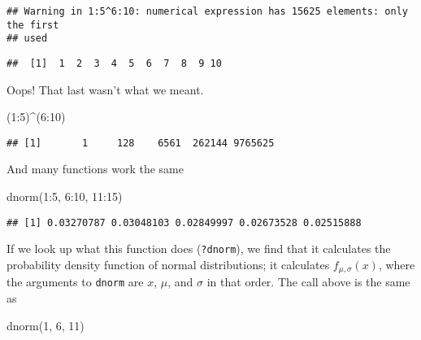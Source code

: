 \documentclass[
]{article}
\newenvironment{Shaded}{\begin{snugshade}}{\end{snugshade}}
\newcommand{\DecValTok}[1]{\textcolor[rgb]{0.00,0.00,0.81}{#1}}
\newcommand{\FunctionTok}[1]{\textcolor[rgb]{0.00,0.00,0.00}{#1}}
\newcommand{\NormalTok}[1]{#1}
\newcommand{\SpecialCharTok}[1]{\textcolor[rgb]{0.00,0.00,0.00}{#1}}
\begin{document}
\begin{verbatim}
## Warning in 1:5^6:10: numerical expression has 15625 elements: only the first
## used
\end{verbatim}

\begin{verbatim}
##  [1]  1  2  3  4  5  6  7  8  9 10
\end{verbatim}

Oops! That last wasn't what we meant.

\begin{Shaded}
\begin{Highlighting}[]
\NormalTok{(}\DecValTok{1}\SpecialCharTok{:}\DecValTok{5}\NormalTok{)}\SpecialCharTok{\^{}}\NormalTok{(}\DecValTok{6}\SpecialCharTok{:}\DecValTok{10}\NormalTok{)}
\end{Highlighting}
\end{Shaded}

\begin{verbatim}
## [1]       1     128    6561  262144 9765625
\end{verbatim}

And many functions work the same

\begin{Shaded}
\begin{Highlighting}[]
\FunctionTok{dnorm}\NormalTok{(}\DecValTok{1}\SpecialCharTok{:}\DecValTok{5}\NormalTok{, }\DecValTok{6}\SpecialCharTok{:}\DecValTok{10}\NormalTok{, }\DecValTok{11}\SpecialCharTok{:}\DecValTok{15}\NormalTok{)}
\end{Highlighting}
\end{Shaded}

\begin{verbatim}
## [1] 0.03270787 0.03048103 0.02849997 0.02673528 0.02515888
\end{verbatim}

If we look up what this function does (\texttt{?dnorm}), we find that it
calculates the probability density function of normal distributions; it
calculates \(f_{\mu, \sigma}(x)\), where the arguments to \texttt{dnorm}
are \(x\), \(\mu\), and \(\sigma\) in that order. The call above is the
same as

\begin{Shaded}
\begin{Highlighting}[]
\FunctionTok{dnorm}\NormalTok{(}\DecValTok{1}\NormalTok{, }\DecValTok{6}\NormalTok{, }\DecValTok{11}\NormalTok{)}
\end{Highlighting}
\end{Shaded}
\end{document}
